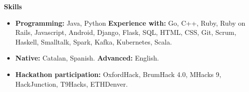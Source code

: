 \documentclass[letterpaper,10pt]{article}
\newcommand{\resitem}[1]{\item #1 \vspace{-2pt}}
\newcommand{\resheading}[1]{{\large \colorbox{mygrey}{\begin{minipage}{\textwidth}{\textbf{#1 \vphantom{p\^{E}}}}\end{minipage}}}}
\begin{document}
\resheading{Skills}
	\begin{itemize}
		\resitem{\textbf{Programming:} Java, Python \textbf{Experience with:}  Go, C++, Ruby, Ruby on Rails, Javascript, Android, Django, Flask, SQL, HTML, CSS, Git, Scrum, Haskell, Smalltalk, Spark, Kafka, Kubernetes, Scala.}
		\resitem{\textbf{Native:} Catalan, Spanish. \textbf{Advanced:} English.}
		\resitem{\textbf{Hackathon participation:} OxfordHack, BrumHack 4.0, MHacks 9, HackJunction, T9Hacks, ETHDenver.}
	\end{itemize}
\end{document}
